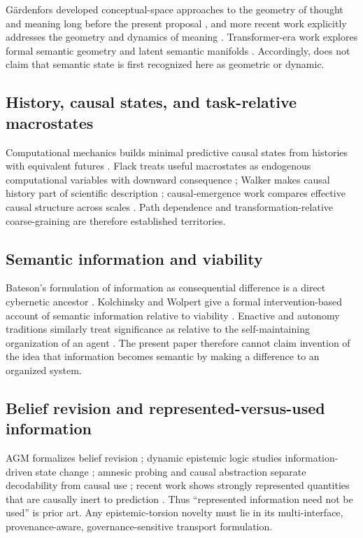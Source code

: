G{\"a}rdenfors developed conceptual-space approaches to the geometry of thought and meaning long before the present proposal \citep{Gardenfors2000,Gardenfors2014}, and more recent work explicitly addresses the geometry and dynamics of meaning \citep{Gardenfors2025}. Transformer-era work explores formal semantic geometry and latent semantic manifolds \citep{ZhangEtAl2022SemanticGeometry,Mabrok2026,HuNiuVarma2026,deZarzaEtAl2026}. Accordingly, \CBRD does not claim that semantic state is first recognized here as geometric or dynamic.

\subsection{History, causal states, and task-relative macrostates}

Computational mechanics builds minimal predictive causal states from histories with equivalent futures \citep{CrutchfieldYoung1989,RupeCrutchfield2024}. Flack treats useful macrostates as endogenous computational variables with downward consequence \citep{Flack2017}; Walker makes causal history part of scientific description \citep{Walker2014,SharmaEtAl2023}; causal-emergence work compares effective causal structure across scales \citep{HoelEtAl2013,Hoel2017}. Path dependence and transformation-relative coarse-graining are therefore established territories.

\subsection{Semantic information and viability}

Bateson's formulation of information as consequential difference is a direct cybernetic ancestor \citep{Bateson1972}. Kolchinsky and Wolpert give a formal intervention-based account of semantic information relative to viability \citep{KolchinskyWolpert2018}. Enactive and autonomy traditions similarly treat significance as relative to the self-maintaining organization of an agent \citep{MaturanaVarela1980,MorenoMossio2015}. The present paper therefore cannot claim invention of the idea that information becomes semantic by making a difference to an organized system.

\subsection{Belief revision and represented-versus-used information}

AGM formalizes belief revision \citep{AGM1985,Gardenfors1988}; dynamic epistemic logic studies information-driven state change \citep{vanDitmarschEtAl2007}; amnesic probing and causal abstraction separate decodability from causal use \citep{ElazarEtAl2021,GeigerEtAl2021,GeigerEtAl2023}; recent work shows strongly represented quantities that are causally inert to prediction \citep{LiaoCao2026}. Thus ``represented information need not be used'' is prior art. Any epistemic-torsion novelty must lie in its multi-interface, provenance-aware, governance-sensitive transport formulation.

